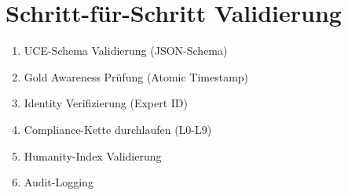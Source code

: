 \documentclass[11pt,a4paper]{report}
\begin{document}
\section{Schritt-für-Schritt Validierung}

\begin{enumerate}
    \item UCE-Schema Validierung (JSON-Schema)
    \item Gold Awareness Prüfung (Atomic Timestamp)
    \item Identity Verifizierung (Expert ID)
    \item Compliance-Kette durchlaufen (L0-L9)
    \item Humanity-Index Validierung
    \item Audit-Logging
\end{enumerate}
\end{document}
